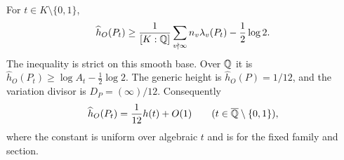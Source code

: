 

\begin{statement}
For $t\in K\setminus\{0,1\}$,
\begin{equation}\label{eq:ch-bound}
 \widehat h_O(P_t)\geq
 \frac1{[K:\mathbb Q]}\sum_{v\nmid\infty}n_v\lambda_v(P_t)
                    -\frac12\log2.
\end{equation}
The inequality is strict on this smooth base. Over $\mathbb Q$ it
is $\widehat h_O(P_t)\geq\log A_t-\frac12\log2$.
The generic height is $\widehat h_O(P)=1/12$, and the
variation divisor is $D_P=(\infty)/12$. Consequently
\[
 \widehat h_O(P_t)=\frac1{12}h(t)+O(1)
 \qquad(t\in\overline{\mathbb Q}\setminus\{0,1\}),
\]
where the constant is uniform over algebraic $t$ and is for
the fixed family and section.
\end{statement}

